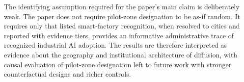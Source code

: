 The identifying assumption required for the paper’s main claim is deliberately weak. The paper does not require pilot-zone designation to be as-if random. It requires only that listed smart-factory recognition, when resolved to cities and reported with evidence tiers, provides an informative administrative trace of recognized industrial AI adoption. The results are therefore interpreted as evidence about the geography and institutional architecture of diffusion, with causal evaluation of pilot-zone designation left to future work with stronger counterfactual designs and richer controls.
